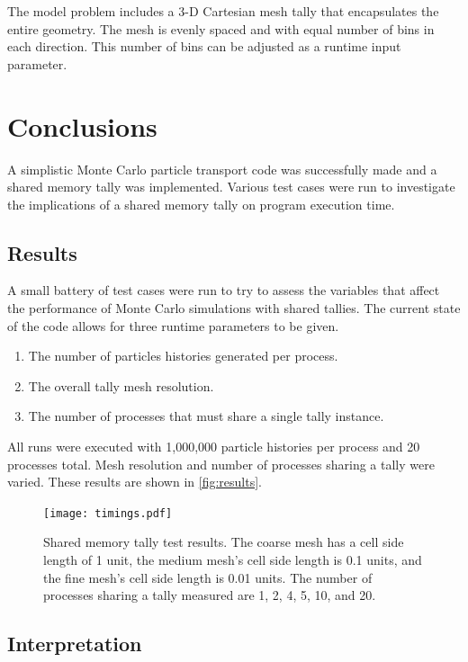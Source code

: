 \documentclass{mc2015}
\begin{document}
The model problem includes a 3-D Cartesian mesh tally
that encapsulates the entire geometry.
The mesh is evenly spaced and with equal number of bins in each direction.
This number of bins can be adjusted as a runtime input parameter.

\section{Conclusions}

A simplistic Monte Carlo particle transport code was successfully made
and a shared memory tally was implemented.
Various test cases were run to investigate the implications
of a shared memory tally on program execution time.

\subsection{Results}

A small battery of test cases were run to try to assess the variables
that affect the performance of Monte Carlo simulations with shared tallies.
The current state of the code allows for three runtime parameters to be given.
\begin{enumerate}
	\item The number of particles histories generated per process.
	\item The overall tally mesh resolution.
	\item The number of processes that must share a single tally instance.
\end{enumerate}
All runs were executed with 1,000,000 particle histories per process
and 20 processes total.
Mesh resolution and number of processes sharing a tally were varied.
These results are shown in \autoref{fig:results}.

\begin{figure}[h]
	\centering
	\texttt{[image: timings.pdf]}
	\caption{Shared memory tally test results.
		The coarse mesh has a cell side length of 1 unit,
		the medium mesh's cell side length is 0.1 units,
		and the fine mesh's cell side length is 0.01 units.
		The number of processes sharing a tally measured are 1, 2, 4, 5, 10, and 20.}
	\label{fig:results}
\end{figure}

\subsection{Interpretation}
\end{document}
